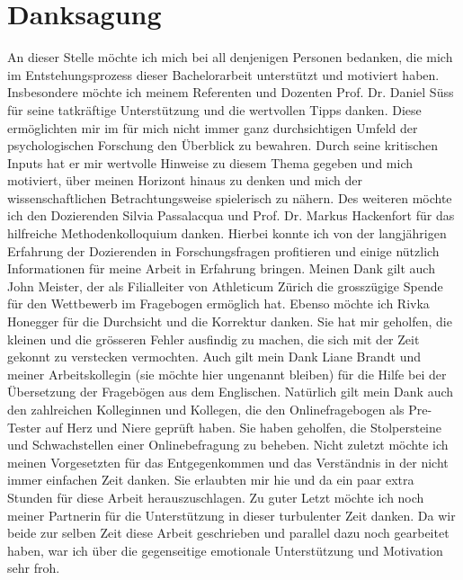 %
%
\thispagestyle{empty} 
\let\raggedsection\centering
\chapter*{Danksagung}\label{label.danksagung}
\let\raggedsection\raggedright 
An dieser Stelle möchte ich mich bei all denjenigen Personen bedanken, die mich im Entstehungsprozess dieser Bachelorarbeit unterstützt und motiviert haben. Insbesondere möchte ich meinem Referenten und Dozenten Prof. Dr. Daniel Süss für seine tatkräftige Unterstützung und die wertvollen Tipps danken. Diese ermöglichten mir im für mich nicht immer ganz durchsichtigen Umfeld der psychologischen Forschung den Überblick zu bewahren. Durch seine kritischen Inputs hat er mir wertvolle Hinweise zu diesem Thema gegeben und mich motiviert, über meinen Horizont hinaus zu denken und mich der wissenschaftlichen Betrachtungsweise spielerisch zu nähern. Des weiteren möchte ich den Dozierenden Silvia Passalacqua und Prof. Dr. Markus Hackenfort für das hilfreiche Methodenkolloquium danken. Hierbei konnte ich von der langjährigen Erfahrung der Dozierenden in Forschungsfragen profitieren und einige nützlich Informationen für meine Arbeit in Erfahrung bringen. Meinen Dank gilt auch John Meister, der als Filialleiter von Athleticum Zürich die grosszügige Spende für den Wettbewerb im Fragebogen ermöglich hat. Ebenso möchte ich Rivka Honegger für die Durchsicht und die Korrektur danken. Sie hat mir geholfen, die kleinen und die grösseren Fehler ausfindig zu machen, die sich mit der Zeit gekonnt zu verstecken vermochten. Auch gilt mein Dank Liane Brandt und meiner Arbeitskollegin (sie möchte hier ungenannt bleiben) für die Hilfe bei der Übersetzung der Fragebögen aus dem Englischen. Natürlich gilt mein Dank auch den zahlreichen Kolleginnen und Kollegen, die den Onlinefragebogen als Pre-Tester auf Herz und Niere geprüft haben. Sie haben geholfen, die Stolpersteine und Schwachstellen einer Onlinebefragung zu beheben. Nicht zuletzt möchte ich meinen Vorgesetzten für das Entgegenkommen und das Verständnis in der nicht immer einfachen Zeit danken. Sie erlaubten mir hie und da ein paar extra Stunden für diese Arbeit herauszuschlagen. Zu guter Letzt möchte ich noch meiner Partnerin für die Unterstützung in dieser turbulenter Zeit danken. Da wir beide zur selben Zeit diese Arbeit geschrieben und parallel dazu noch gearbeitet haben, war ich über die gegenseitige emotionale Unterstützung und Motivation sehr froh. 